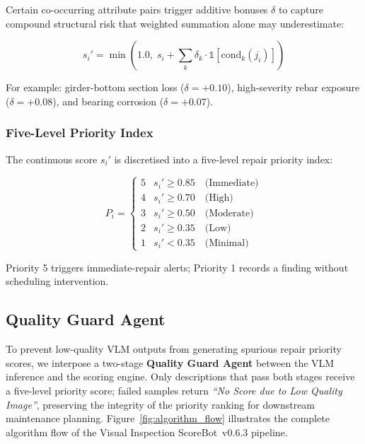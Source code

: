 \documentclass[twocolumn]{article}
\begin{document}
Certain co-occurring attribute pairs trigger additive bonuses $\delta$ to
capture compound structural risk that weighted summation alone may underestimate:

\begin{equation}
  s_i' = \min\!\left(1.0,\; s_i + \sum_k \delta_k \cdot \mathbb{1}[\text{cond}_k(j_i)]\right)
  \label{eq:bonus}
\end{equation}

For example: girder-bottom section loss ($\delta=+0.10$), high-severity rebar
exposure ($\delta=+0.08$), and bearing corrosion ($\delta=+0.07$).

\subsubsection{Five-Level Priority Index}

The continuous score $s_i'$ is discretised into a five-level repair
priority index:

\begin{equation}
  P_i = \begin{cases}
    5 & s_i' \geq 0.85 \quad \text{(Immediate)} \\
    4 & s_i' \geq 0.70 \quad \text{(High)} \\
    3 & s_i' \geq 0.50 \quad \text{(Moderate)} \\
    2 & s_i' \geq 0.35 \quad \text{(Low)} \\
    1 & s_i' <  0.35 \quad \text{(Minimal)}
  \end{cases}
  \label{eq:priority}
\end{equation}

Priority 5 triggers immediate-repair alerts; Priority 1 records a finding
without scheduling intervention.

\subsection{Quality Guard Agent}
\label{sec:quality_guard}

To prevent low-quality VLM outputs from generating spurious repair priority
scores, we interpose a two-stage \textbf{Quality Guard Agent} between the
VLM inference and the scoring engine.
Only descriptions that pass both stages receive a five-level priority score;
failed samples return \textit{``No Score due to Low Quality Image''}, preserving
the integrity of the priority ranking for downstream maintenance planning.
Figure~\ref{fig:algorithm_flow} illustrates the complete algorithm flow
of the Visual Inspection ScoreBot~v0.6.3 pipeline.
\end{document}
